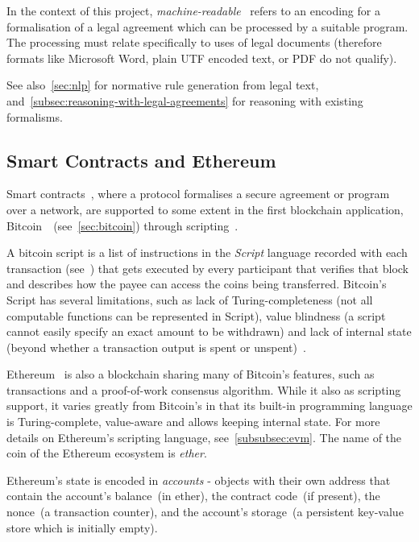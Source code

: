 In the context of this project, \emph{machine-readable}~\cite{cambridgeMachineReadable, openDataMachineReadable} refers to an encoding for a formalisation of a legal agreement which can be processed by a suitable program.
The processing must relate specifically to uses of legal documents (therefore formats like Microsoft Word, plain UTF encoded text, or PDF do not qualify).

See also~\autoref{sec:nlp} for normative rule generation from legal text, and~\autoref{subsec:reasoning-with-legal-agreements} for reasoning with existing formalisms.

\subsection{Smart Contracts and Ethereum}\label{sec:ethereum}

Smart contracts~\cite{szabo1997smart-contracts}, where a protocol formalises a secure agreement or program over a
network, are supported to some extent in the first blockchain application, Bitcoin~\cite{nakamoto2008bitcoin}~(see~\ref{sec:bitcoin}) through scripting~\cite{bitcoinwiki-scripts}.

A bitcoin script is a list of instructions in the \textit{Script} language recorded with each transaction
(see~) that gets executed by every participant that verifies that block and describes how the
payee can access the coins being transferred.
Bitcoin's Script has several limitations, such as lack of Turing-completeness (not all computable functions can be
represented in Script), value blindness (a script cannot easily specify an exact amount to be
withdrawn) and lack of internal state (beyond whether a transaction output is spent or
unspent)~\cite{buterin2015ethereum}.

Ethereum~\cite{buterin2015ethereum} is also a blockchain sharing many of Bitcoin's features, such as transactions and
a proof-of-work consensus algorithm.
While it also as scripting support, it varies greatly from Bitcoin's in that its built-in programming language is
Turing-complete, value-aware and allows keeping internal state.
For more details on Ethereum's scripting language, see~\ref{subsubsec:evm}.
The name of the coin of the Ethereum ecosystem is \textit{ether}.

Ethereum's state is encoded in \textit{accounts} - objects with their own address that contain the account's
balance~(in ether), the contract code~(if present), the nonce~(a transaction counter), and the account's
storage~(a persistent key-value store which is initially empty).

